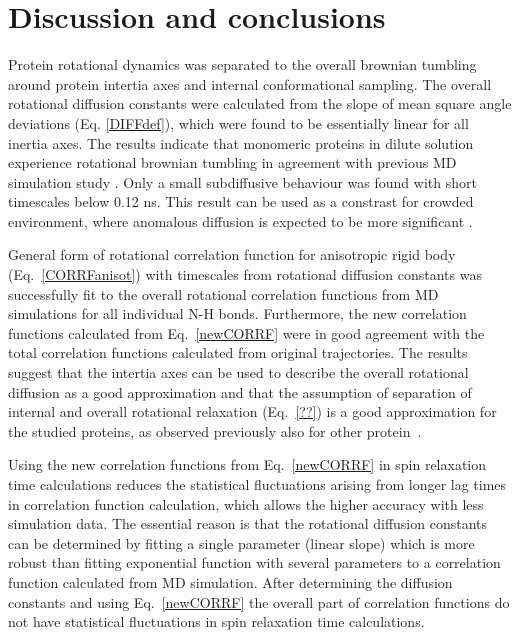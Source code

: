 \documentclass[pre,aps,floatfix,authordate1-4,twocolumn]{revtex4-1}
\begin{document}
\section{Discussion and conclusions}
Protein rotational dynamics was separated to the overall
brownian tumbling around protein intertia axes and internal
conformational sampling. The overall rotational diffusion constants
were calculated from the slope of mean square angle deviations (Eq. \ref{DIFFdef}),
which were found to be essentially linear for all inertia axes.
The results indicate that monomeric proteins in dilute solution
experience rotational brownian tumbling in agreement with previous
MD simulation study \cite{wong08}. Only a small subdiffusive behaviour
was found with short timescales below 0.12 ns. This result can be used as a constrast
for crowded environment, where anomalous diffusion is expected to
be more significant \cite{hofling13}.

General form of rotational correlation function for anisotropic rigid body
(Eq.~\ref{CORRFanisot}) with timescales from rotational diffusion constants
was successfully fit to the overall rotational correlation functions from
MD simulations for all individual N-H bonds. Furthermore, the new correlation
functions calculated from Eq.~\ref{newCORRF} were in good agreement with
the total correlation functions calculated from original trajectories.
The results suggest that the intertia axes can be used to describe
the overall rotational diffusion as a good approximation and that
the assumption of separation of internal and overall rotational
relaxation (Eq.~\ref{??}) is a good approximation for the studied
proteins, as observed previously also for other protein~\cite{wong08,allner15}.

Using the new correlation functions from Eq.~\ref{newCORRF} in
spin relaxation time calculations reduces the statistical fluctuations
arising from longer lag times in correlation function calculation,
which allows the higher accuracy with less simulation data.
The essential reason is that the rotational diffusion constants
can be determined by fitting a single parameter (linear slope) which is
more robust than fitting exponential function with several parameters to
a correlation function calculated from MD simulation. After determining
the diffusion constants and using Eq.~\ref{newCORRF} the overall
part of correlation functions do not have statistical fluctuations
in spin relaxation time calculations.
\end{document}
